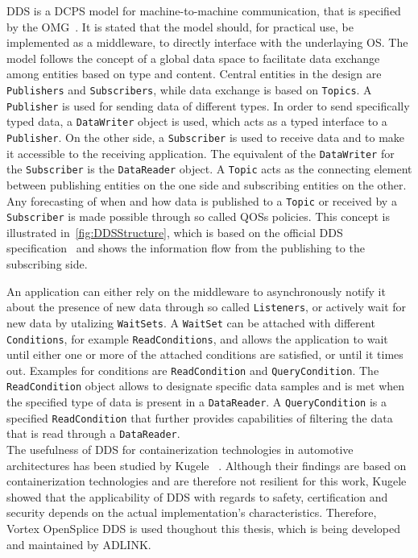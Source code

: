 \Gls*{DDS} is a \gls*{DCPS} model for machine-to-machine communication, that is specified by the \gls*{OMG}~\cite{omgDDSspec}.
It is stated that the model should, for practical use, be implemented as a middleware, to directly interface with the underlaying \gls*{OS}.
The model follows the concept of a global data space to facilitate data exchange among entities based on type and content.
Central entities in the design are \texttt{Publishers} and \texttt{Subscribers}, while data exchange is based on \texttt{Topics}.
A \texttt{Publisher} is used for sending data of different types.
In order to send specifically typed data, a \texttt{DataWriter} object is used, which acts as a typed interface to a \texttt{Publisher}.
On the other side, a \texttt{Subscriber} is used to receive data and to make it accessible to the receiving application.
The equivalent of the \texttt{DataWriter} for the \texttt{Subscriber} is the \texttt{DataReader} object.
A \texttt{Topic} acts as the connecting element between publishing entities on the one side and subscribing entities on the other.
Any forecasting of when and how data is published to a \texttt{Topic} or received by a \texttt{Subscriber} is made possible through so called \glspl*{QOS} policies.
This concept is illustrated in~\autoref{fig:DDSStructure}, which is based on the official \gls*{DDS} specification~\cite{omgDDSspec} and shows the information flow from the publishing to the subscribing side.

An application can either rely on the middleware to asynchronously notify it about the presence of new data through so called \texttt{Listeners}, or actively wait for new data by utalizing \texttt{WaitSets}.
A \texttt{WaitSet} can be attached with different \texttt{Conditions}, for example \texttt{ReadConditions}, and allows the application to wait until either one or more of the attached conditions are satisfied, or until it times out.
Examples for conditions are \texttt{ReadCondition} and \texttt{QueryCondition}.
The \texttt{ReadCondition} object allows to designate specific data samples and is met when the specified type of data is present in a \texttt{DataReader}.
A \texttt{QueryCondition} is a specified \texttt{ReadCondition} that further provides capabilities of filtering the data that is read through a \texttt{DataReader}.
\\

The usefulness of \gls*{DDS} for containerization technologies in automotive architectures has been studied by Kugele \etal~\cite{KugeleDataCentricForAuto}.
Although their findings are based on containerization technologies and are therefore not resilient for this work, Kugele \etal showed that the applicability of \gls*{DDS} with regards to safety, certification and security depends on the actual implementation's characteristics.
Therefore, Vortex OpenSplice DDS is used thoughout this thesis, which is being developed and maintained by ADLINK.

